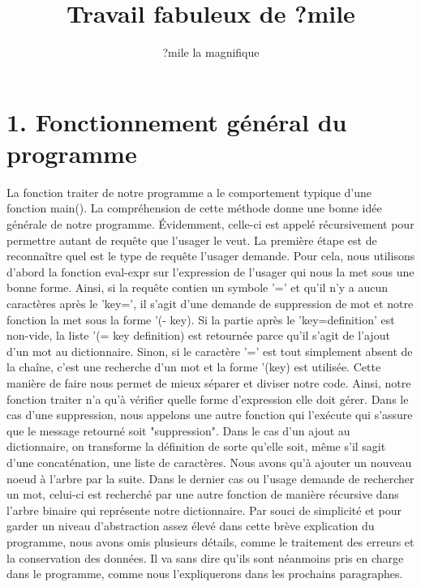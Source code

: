 \documentclass[french]{article}
\title{Travail fabuleux de ?mile}
\author{?mile la magnifique}
\begin{document}
	\maketitle
	
	
	\section{1. Fonctionnement général du programme}
		La fonction traiter de notre programme a le comportement typique d'une fonction main(). La compréhension de cette méthode
		donne une bonne idée générale de notre programme. Évidemment, celle-ci est appelé récursivement pour permettre autant de 
		requête que l'usager le veut.
			La première étape est de reconnaître quel est le type de requête l'usager demande. Pour cela, nous utilisons d'abord
		la fonction eval-expr sur l'expression de l'usager qui nous la met sous une bonne forme. Ainsi, si la requête contien un
		symbole '=' et qu'il n'y a aucun caractères après le 'key=', il s'agit d'une demande de suppression de mot et notre fonction
		la met sous la forme '(- key). Si la partie après le 'key=definition' est non-vide, la liste '(= key definition) est retournée parce 
		qu'il s'agit de l'ajout d'un mot au dictionnaire. Sinon, si le caractère '=' est tout simplement absent de la chaîne, c'est
		une recherche d'un mot et la forme '(key) est utilisée. Cette manière de faire nous permet de mieux séparer et diviser notre
		code. 
			Ainsi, notre fonction traiter n'a qu'à vérifier quelle forme d'expression elle doit gérer. Dans le cas d'une suppression,
		nous appelons une autre fonction qui l'exécute qui s'assure que le message retourné soit "suppression". Dans le cas d'un ajout 
		au dictionnaire, on transforme la définition de sorte qu'elle soit, même s'il sagit d'une concaténation, une liste de caractères.
		Nous avons qu'à ajouter un nouveau noeud à l'arbre par la suite. Dans le dernier cas ou l'usage demande de rechercher un mot,
		celui-ci est recherché par une autre fonction de manière récursive dans l'arbre binaire qui représente notre dictionnaire.
			Par souci de simplicité et pour garder un niveau d’abstraction assez élevé dans cette brève explication du programme,
		nous avons omis plusieurs détails, comme le traitement des erreurs et la conservation des données. Il va sans dire qu’ils sont
		néanmoins pris en charge dans le programme, comme nous l’expliquerons dans les prochains paragraphes.		
		
\end{document}
